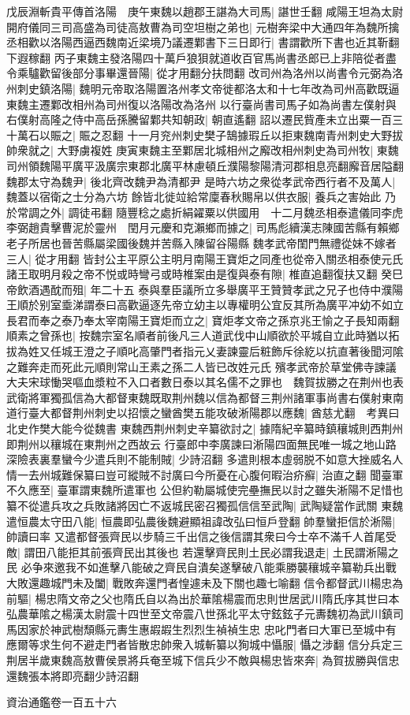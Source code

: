 戊辰淵斬貴平傳首洛陽　庚午東魏以趙郡王諶為大司馬|{
	諶世壬翻}
咸陽王坦為太尉開府儀同三司高盛為司徒高敖曹為司空坦樹之弟也|{
	元樹奔梁中大通四年為魏所擒}
丞相歡以洛陽西逼西魏南近梁境乃議遷鄴書下三日即行|{
	書謂歡所下書也近其靳翻下遐稼翻}
丙子東魏主發洛陽四十萬戶狼狽就道收百官馬尚書丞郎已上非陪從者盡令乘驢歡留後部分事畢還晉陽|{
	從才用翻分扶問翻}
改司州為洛州以尚書令元弼為洛州刺史鎮洛陽|{
	魏明元帝取洛陽置洛州孝文帝徙都洛太和十七年改為司州高歡既逼東魏主遷鄴改相州為司州復以洛陽改為洛州}
以行臺尚書司馬子如為尚書左僕射與右僕射高隆之侍中高岳孫騰留鄴共知朝政|{
	朝直遙翻}
詔以遷民貲產未立出粟一百三十萬石以賑之|{
	賑之忍翻}
十一月兖州刺史樊子鵠據瑕丘以拒東魏南青州刺史大野拔帥衆就之|{
	大野虜複姓}
庚寅東魏主至鄴居北城相州之廨改相州刺史為司州牧|{
	東魏司州領魏陽平廣平汲廣宗東郡北廣平林慮頓丘濮陽黎陽清河郡相息亮翻廨音居隘翻}
魏郡太守為魏尹|{
	後北齊改魏尹為清都尹}
是時六坊之衆從孝武帝西行者不及萬人|{
	魏蓋以宿衛之士分為六坊}
餘皆北徙竝給常廩春秋賜帛以供衣服|{
	養兵之害始此}
乃於常調之外|{
	調徒弔翻}
隨豐稔之處折絹糴粟以供國用　十二月魏丞相泰遣儀同李虎李弼趙貴擊曹泥於靈州　閏月元慶和克瀨鄉而據之|{
	司馬彪續漢志陳國苦縣有賴鄉老子所居也晉苦縣屬梁國後魏并苦縣入陳留谷陽縣}
魏孝武帝閨門無禮從妹不嫁者三人|{
	從才用翻}
皆封公主平原公主明月南陽王寶炬之同產也從帝入關丞相泰使元氏諸王取明月殺之帝不悦或時彎弓或時椎案由是復與泰有隙|{
	椎直追翻復扶又翻}
癸巳帝飲酒遇酖而殂|{
	年二十五}
泰與羣臣議所立多舉廣平王贊贊孝武之兄子也侍中濮陽王順於别室埀涕謂泰曰高歡逼逐先帝立幼主以專權明公宜反其所為廣平冲幼不如立長君而奉之泰乃奉太宰南陽王寶炬而立之|{
	寶炬孝文帝之孫京兆王愉之子長知兩翻}
順素之曾孫也|{
	按魏宗室名順者前後凡三人道武伐中山順欲於平城自立此時猶以拓拔為姓又任城王澄之子順叱高肇門者指元乂妻諫靈后粧飾斥徐紇以抗直著後聞河隂之難奔走而死此元順則常山王素之孫二人皆已改姓元氏}
殯孝武帝於草堂佛寺諫議大夫宋球慟哭嘔血漿粒不入口者數日泰以其名儒不之罪也　魏賀拔勝之在荆州也表武衛將軍獨孤信為大都督東魏既取荆州魏以信為都督三荆州諸軍事尚書右僕射東南道行臺大都督荆州刺史以招懷之蠻酋樊五能攻破淅陽郡以應魏|{
	酋慈尤翻　考異曰北史作樊大能今從魏書}
東魏西荆州刺史辛纂欲討之|{
	據隋紀辛纂時鎮穰城則西荆州即荆州以穰城在東荆州之西故云}
行臺郎中李廣諫曰淅陽四面無民唯一城之地山路深險表裏羣蠻今少遣兵則不能制賊|{
	少詩沼翻}
多遣則根本虛弱脱不如意大挫威名人情一去州城難保纂曰豈可縱賊不討廣曰今所憂在心腹何暇治疥癬|{
	治直之翻}
聞臺軍不久應至|{
	臺軍謂東魏所遣軍也}
公但約勒屬城使完壘撫民以討之雖失淅陽不足惜也纂不從遣兵攻之兵敗諸將因亡不返城民密召獨孤信信至武陶|{
	武陶疑當作武關}
東魏遣恒農太守田八能|{
	恒農即弘農後魏避顯祖諱改弘曰恒戶登翻}
帥羣蠻拒信於淅陽|{
	帥讀曰率}
又遣都督張齊民以步騎三千出信之後信謂其衆曰今士卒不滿千人首尾受敵|{
	謂田八能拒其前張齊民出其後也}
若還擊齊民則土民必謂我退走|{
	土民謂淅陽之民}
必争來邀我不如進擊八能破之齊民自潰矣遂擊破八能乘勝襲穰城辛纂勒兵出戰大敗還趣城門未及闔|{
	戰敗奔還門者惶遽未及下關也趣七喻翻}
信令都督武川楊忠為前驅|{
	楊忠隋文帝之父也隋氏自以為出於華隂楊震而忠則世居武川隋氏序其世曰本弘農華隂之楊漢太尉震十四世至文帝震八世孫北平太守鉉鉉子元夀魏初為武川鎮司馬因家於神武樹頹縣元夀生惠嘏嘏生烈烈生禎禎生忠}
忠叱門者曰大軍已至城中有應爾等求生何不避走門者皆散忠帥衆入城斬纂以狥城中懾服|{
	懾之涉翻}
信分兵定三荆居半歲東魏高敖曹侯景將兵奄至城下信兵少不敵與楊忠皆來奔|{
	為賀拔勝與信忠還魏張本將即亮翻少詩沼翻}


資治通鑑卷一百五十六
